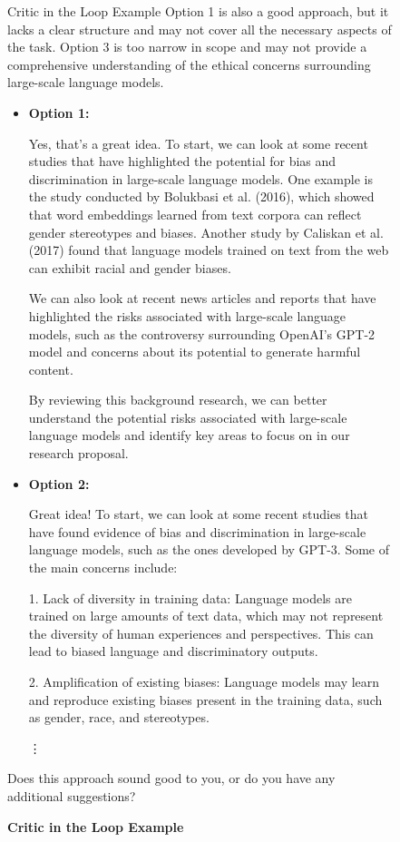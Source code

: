 \begin{figure}[H]
\begin{AIBox}{Critic in the Loop Example}
		Option 1 is also a good approach, but it lacks a clear structure and may not cover all the necessary aspects of the task. Option 3 is too narrow in scope and may not provide a comprehensive understanding of the ethical concerns surrounding large-scale language models.

		\assistantmsg

		\begin{itemize}

			\item \textbf{Option 1:}

			      Yes, that's a great idea. To start, we can look at some recent studies that have highlighted the potential for bias and discrimination in large-scale language models. One example is the study conducted by Bolukbasi et al. (2016), which showed that word embeddings learned from text corpora can reflect gender stereotypes and biases. Another study by Caliskan et al. (2017) found that language models trained on text from the web can exhibit racial and gender biases.

			      We can also look at recent news articles and reports that have highlighted the risks associated with large-scale language models, such as the controversy surrounding OpenAI's GPT-2 model and concerns about its potential to generate harmful content.

			      By reviewing this background research, we can better understand the potential risks associated with large-scale language models and identify key areas to focus on in our research proposal.

			\item \textbf{Option 2:}

			      Great idea! To start, we can look at some recent studies that have found evidence of bias and discrimination in large-scale language models, such as the ones developed by GPT-3. Some of the main concerns include:

			      1. Lack of diversity in training data: Language models are trained on large amounts of text data, which may not represent the diversity of human experiences and perspectives. This can lead to biased language and discriminatory outputs.

			      2. Amplification of existing biases: Language models may learn and reproduce existing biases present in the training data, such as gender, race, and stereotypes.


			      \begin{center}
				      \hspace{0cm}\vdots
			      \end{center}

		\end{itemize}

		Does this approach sound good to you, or do you have any additional suggestions?

	\end{AIBox}
	\caption{\textbf{Critic in the Loop Example}}
	\label{fig:critic_example}
\end{figure}



